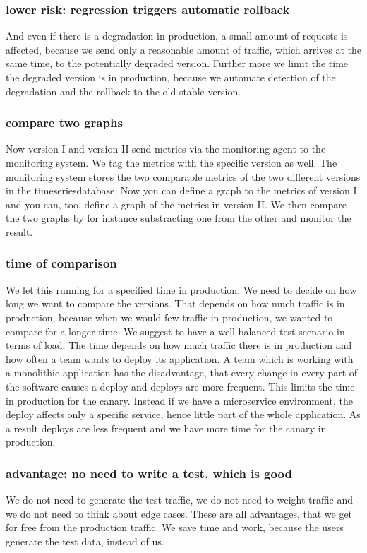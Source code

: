 \subsubsection{lower risk: regression triggers automatic rollback}
And even if there is a degradation in production, a small amount of requests is affected,
because we send only a reasonable amount of traffic, which arrives at the same time, to
the potentially degraded version. Further more we limit the time the degraded version is
in production, because we automate detection of the degradation and the rollback to the
old stable version.

\subsubsection{compare two graphs}
Now version I and version II send metrics via the monitoring agent to the monitoring
system. We tag the metrics with the specific version as well. The monitoring system stores
the two comparable metrics of the two different versions in the timeseriesdatabase. Now
you can define a graph to the metrics of version I and you can, too, define a graph of the
metrics in version II. We then compare the two graphs by for instance substracting one
from the other and monitor the result.

\subsubsection{time of comparison}
We let this running for a specified time in production. We need to decide on how long we
want to compare the versions. That depends on how much traffic is in production, because
when we would few traffic in production, we wanted to compare for a longer time. We
suggest to have a well balanced test scenario in terms of load. The time depends on how
much traffic there is in production and how often a team wants to deploy its
application. A team which is working with a monolithic application has the disadvantage,
that every change in every part of the software causes a deploy and deploys are more
frequent. This limits the time in production for the canary. Instead if we have a
microservice environment, the deploy affects only a specific service, hence little part of
the whole application. As a result deploys are less frequent and we have more time for the
canary in production.

\subsubsection{advantage: no need to write a test, which is good}
We do not need to generate the test traffic, we do not need to weight traffic and we do
not need to think about edge cases. These are all advantages, that we get for free from
the production traffic. We save time and work, because the users generate the test data,
instead of us.


